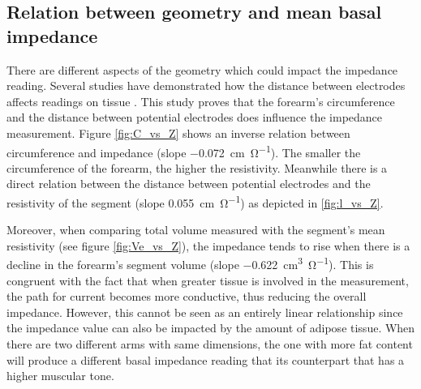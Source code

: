 \subsection{Relation between geometry and mean basal impedance}
\label{section basal 2}
There are different aspects of the geometry which could impact the impedance reading. Several studies have demonstrated how the distance between electrodes affects readings on tissue \cite{yamamoto1992impedance, kun2000effects}. This study proves that the forearm's circumference and the distance between potential electrodes does influence the impedance measurement. Figure \ref{fig:C_vs_Z} shows an inverse relation between circumference and impedance (slope \SI{-0.072}{\centi\meter\per\ohm}). The smaller the  circumference of the forearm, the higher the resistivity. Meanwhile there is a direct relation between the distance between potential electrodes and the resistivity of the segment (slope \SI{0.055}{\centi\meter\per\ohm}) as depicted in \ref{fig:l_vs_Z}.

Moreover, when comparing total volume measured with the segment's mean resistivity (see figure \ref{fig:Ve_vs_Z}), the impedance tends to rise when there is a decline in the forearm's segment volume (slope \SI{-0.622}{\cubic\centi\metre\per\ohm}). This is congruent with the fact that when greater tissue is involved in the measurement, the path for current becomes more conductive, thus reducing the overall impedance. However, this cannot be seen as an entirely linear relationship since the impedance value can also be impacted by the amount of adipose tissue. When there are two different arms with same dimensions, the one with more fat content will produce a different basal impedance reading that its counterpart that has a higher muscular tone. 

